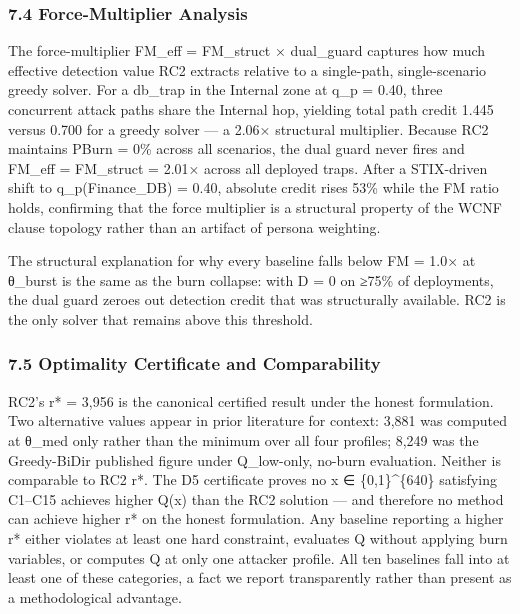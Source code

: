 \documentclass[
  11pt,
]{article}
\begin{document}
\hypertarget{force-multiplier-analysis}{%
\subsubsection{7.4 Force-Multiplier
Analysis}\label{force-multiplier-analysis}}

The force-multiplier FM\_eff = FM\_struct × dual\_guard captures how
much effective detection value RC2 extracts relative to a single-path,
single-scenario greedy solver. For a db\_trap in the Internal zone at
q\_p = 0.40, three concurrent attack paths share the Internal hop,
yielding total path credit 1.445 versus 0.700 for a greedy solver --- a
2.06× structural multiplier. Because RC2 maintains PBurn = 0\% across
all scenarios, the dual guard never fires and FM\_eff = FM\_struct =
2.01× across all deployed traps. After a STIX-driven shift to
q\_p(Finance\_DB) = 0.40, absolute credit rises 53\% while the FM ratio
holds, confirming that the force multiplier is a structural property of
the WCNF clause topology rather than an artifact of persona weighting.

The structural explanation for why every baseline falls below FM = 1.0×
at θ\_burst is the same as the burn collapse: with D = 0 on ≥75\% of
deployments, the dual guard zeroes out detection credit that was
structurally available. RC2 is the only solver that remains above this
threshold.

\hypertarget{optimality-certificate-and-comparability}{%
\subsubsection{7.5 Optimality Certificate and
Comparability}\label{optimality-certificate-and-comparability}}

RC2's r* = 3,956 is the canonical certified result under the honest
formulation. Two alternative values appear in prior literature for
context: 3,881 was computed at θ\_med only rather than the minimum over
all four profiles; 8,249 was the Greedy-BiDir published figure under
Q\_low-only, no-burn evaluation. Neither is comparable to RC2 r*. The D5
certificate proves no x ∈ \{0,1\}\^{}\{640\} satisfying C1--C15 achieves
higher Q(x) than the RC2 solution --- and therefore no method can
achieve higher r* on the honest formulation. Any baseline reporting a
higher r* either violates at least one hard constraint, evaluates Q
without applying burn variables, or computes Q at only one attacker
profile. All ten baselines fall into at least one of these categories, a
fact we report transparently rather than present as a methodological
advantage.
\end{document}
